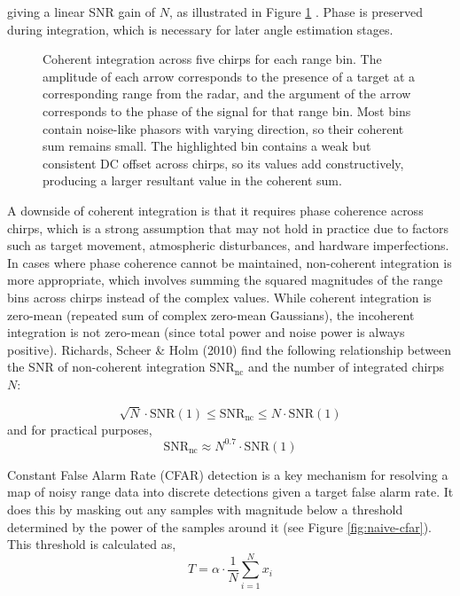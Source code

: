 giving a linear SNR gain of $N$, as illustrated in Figure \ref{fig:coherent_integration} 
\cite{Richards2010}. Phase is preserved during integration, which is necessary for later 
angle estimation stages.

\begin{figure}[htbp]
    \centering
    \caption[Coherent integration across five chirps showing constructive summation of 
    target returns.]{Coherent integration across five chirps for each range bin. The 
    amplitude of each arrow corresponds to the presence of a target at a corresponding 
    range from the radar, and the argument of the arrow corresponds to the phase of the 
    signal for that range bin. Most bins contain noise-like phasors with varying 
    direction, so their coherent sum remains small. The highlighted bin contains a weak 
    but consistent DC offset across chirps, so its values add constructively, producing 
    a larger resultant value in the coherent sum.}
    \label{fig:coherent_integration}
\end{figure}

A downside of coherent integration is that it requires phase coherence across chirps, 
which is a strong assumption that may not hold in practice due to factors such as target 
movement, atmospheric disturbances, and hardware imperfections. In cases where phase 
coherence cannot be maintained, non-coherent integration is more appropriate, which 
involves summing the squared magnitudes of the range bins across chirps instead of the 
complex values. While coherent integration is zero-mean (repeated sum of complex zero-mean 
Gaussians), the incoherent integration is not zero-mean (since total power and noise
power is always positive). Richards, Scheer \& Holm (2010) \cite{Richards2010} 
find the following relationship between the SNR of non-coherent integration 
\(\text{SNR}_{\text{nc}}\) and the number of integrated chirps \(N\):


\begin{equation}
    \sqrt{N} \cdot \text{SNR}(1) \leq \text{SNR}_{\text{nc}} \leq N \cdot \text{SNR}(1)
    \label{eq:snr_noncoherent}
\end{equation}
and for practical purposes,
\begin{equation}
    \text{SNR}_{\text{nc}} \approx N^{0.7} \cdot \text{SNR}(1)
\end{equation}

Constant False Alarm Rate (CFAR) detection is a key mechanism for resolving a map of noisy range data 
into discrete detections given a target false alarm rate. It does this by masking out any samples with 
magnitude below a threshold determined by the power of the samples around it (see Figure 
\ref{fig:naive-cfar}). This threshold is calculated as,
\begin{equation}
    \label{eqn:threshold}
    T = \alpha \cdot \frac{1}{N} \sum_{i=1}^{N} x_i
\end{equation}


